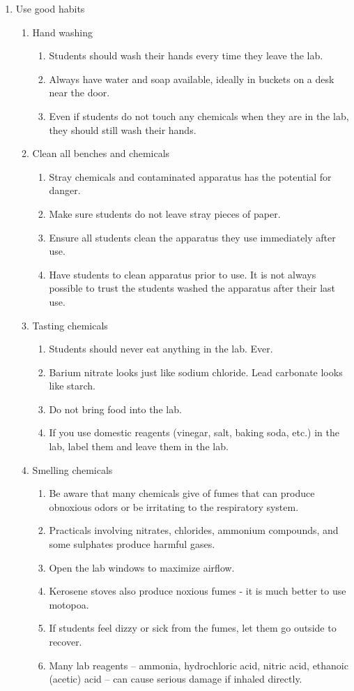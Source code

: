 \begin{enumerate}
\item{Use good habits}
\begin{enumerate}
\item{Hand washing}
\begin{enumerate}
\item{Students should wash their hands every time they leave the lab.}
\item{Always have water and soap available, 
ideally in buckets on a desk near the door.}
\item{Even if students do not touch any chemicals when they are in the lab, 
they should still wash their hands. }
\end{enumerate}
\item{Clean all benches and chemicals}
\begin{enumerate}
\item{Stray chemicals and contaminated apparatus has the potential for danger.}
\item{Make sure students do not leave stray pieces of paper.}
\item{Ensure all students clean the apparatus they use immediately after use.}
\item{Have students to clean apparatus prior to use. 
It is not always possible to trust the students washed the apparatus 
after their last use.}
\end{enumerate}
\item{Tasting chemicals}
\begin{enumerate}
\item{Students should never eat anything in the lab. Ever.}
\item{Barium nitrate looks just like sodium chloride. 
Lead carbonate looks like starch.}
\item{Do not bring food into the lab.}
\item{If you use domestic reagents 
(vinegar, salt, baking soda, etc.) in the lab, 
label them and leave them in the lab.}
\end{enumerate}

\item{Smelling chemicals}
\begin{enumerate}
\item Be aware that many chemicals give of fumes that can produce obnoxious
odors or be irritating to the respiratory system.
\item Practicals involving nitrates, chlorides, ammonium compounds, and some
sulphates produce harmful gases.
\item Open the lab windows to maximize airflow.
\item Kerosene stoves also produce noxious fumes - it is much better to use motopoa.
\item If students feel dizzy or sick from the fumes, let them go outside to recover.
\item{Many lab reagents -- 
ammonia, hydrochloric acid, nitric acid, ethanoic (acetic) acid -- 
can cause serious damage if inhaled directly.}
\end{enumerate}


\end{enumerate}
\end{enumerate}
